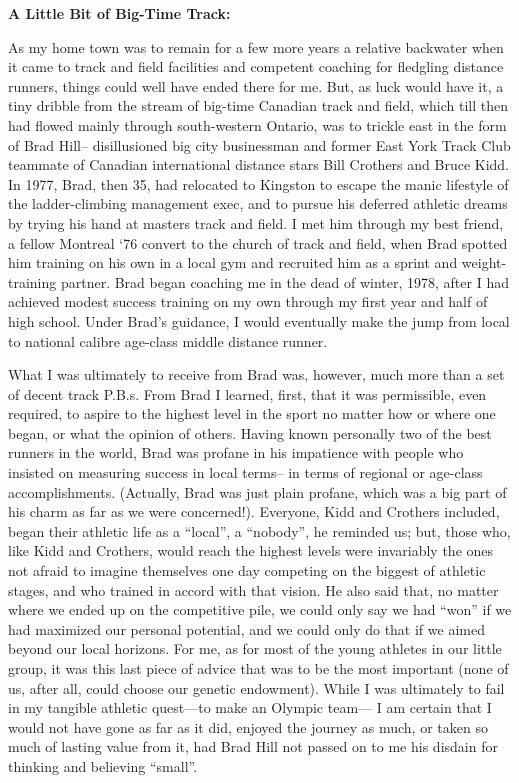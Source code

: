 \bigskip
\textbf{A Little Bit of Big-Time Track:}
\bigskip

As my home town was to remain for a few more years a relative backwater when it came to track and field facilities and competent coaching for fledgling distance runners, things could well have ended there for me. But, as luck would have it, a tiny dribble from the stream of big-time Canadian track and field, which till then had flowed mainly through south-western Ontario, was to trickle east in the form of Brad Hill-- disillusioned big city businessman and former East York Track Club teammate of Canadian international distance stars Bill Crothers and Bruce Kidd. In 1977, Brad, then 35, had relocated to Kingston to escape the manic lifestyle of the ladder-climbing management exec, and to pursue his deferred athletic dreams by trying his hand at masters track and field. I met him through my best friend, a fellow Montreal ‘76 convert to the church of track and field, when Brad spotted him training on his own in a local gym and recruited him as a sprint and weight-training partner. Brad began coaching me in the dead of winter, 1978, after I had achieved modest success training on my own through my first year and half of high school. Under Brad’s guidance, I would eventually make the jump from local to national calibre age-class middle distance runner.


What I was ultimately to receive from Brad was, however, much more than a set of decent track P.B.s. From Brad I learned, first, that it was permissible, even required, to aspire to the highest level in the sport no matter how or where one began, or what the opinion of others. Having known personally two of the best runners in the world, Brad was profane in his impatience with people who insisted on measuring success in local terms-- in terms of regional or age-class accomplishments. (Actually, Brad was just plain profane, which was a big part of his charm as far as we were concerned!). Everyone, Kidd and Crothers included, began their athletic life as a “local”, a “nobody”, he reminded us; but, those who, like Kidd and Crothers, would reach the highest levels were invariably the ones not afraid to imagine themselves one day competing on the biggest of athletic stages, and who trained in accord with that vision. He also said that, no matter where we ended up on the competitive pile, we could only say we had “won” if we had maximized our personal potential, and we could only do that if we aimed beyond our local horizons. For me, as for most of the young athletes in our little group, it was this last piece of advice that was to be the most important (none of us, after all, could choose our genetic endowment). While I was ultimately to fail in my tangible athletic quest—to make an Olympic team— I am certain that I would not have gone as far as it did, enjoyed the journey as much, or taken so much of lasting value from it, had Brad Hill not passed on to me his disdain for thinking and believing “small”.



